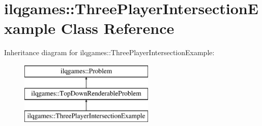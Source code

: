 \hypertarget{classilqgames_1_1_three_player_intersection_example}{}\section{ilqgames\+:\+:Three\+Player\+Intersection\+Example Class Reference}
\label{classilqgames_1_1_three_player_intersection_example}
Inheritance diagram for ilqgames\+:\+:Three\+Player\+Intersection\+Example\+:\begin{figure}[H]
\begin{center}
\leavevmode
\includegraphics[height=3.000000cm]{classilqgames_1_1_three_player_intersection_example}
\end{center}
\end{figure}
